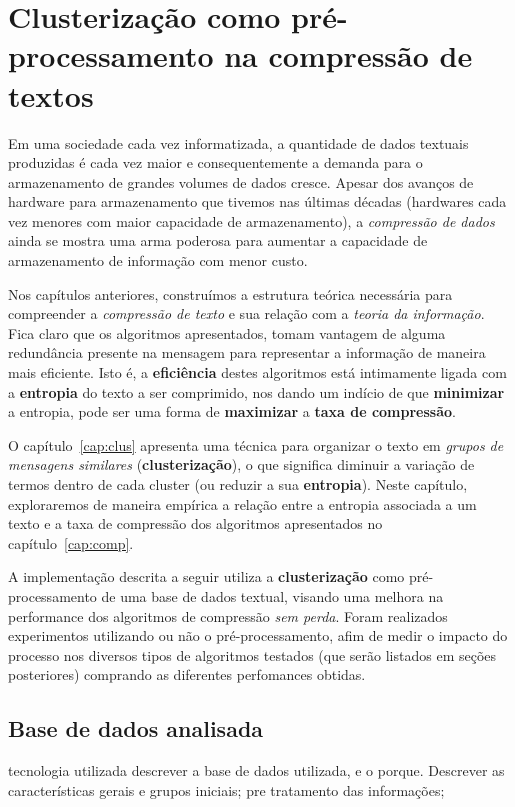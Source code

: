 \chapter{Clusterização como pré-processamento na compressão de textos}
Em uma sociedade cada vez informatizada, a quantidade de dados textuais produzidas é cada vez maior e consequentemente a demanda para o armazenamento de grandes volumes de dados cresce.
Apesar dos avanços de hardware para armazenamento que tivemos nas últimas décadas (hardwares cada vez menores com maior capacidade de armazenamento),
a \emph{compressão de dados} ainda se mostra uma arma poderosa para aumentar a capacidade de armazenamento de informação com menor custo.

Nos capítulos anteriores, construímos a estrutura teórica necessária para compreender a \emph{compressão de texto} e sua relação com a \emph{teoria da informação}.
Fica claro que os algoritmos apresentados, tomam vantagem de alguma redundância presente na mensagem para representar a informação de maneira mais eficiente.
Isto é, a \textbf{eficiência} destes algoritmos está intimamente ligada com a \textbf{entropia} do texto a ser comprimido,
 nos dando um indício de que \textbf{minimizar} a entropia, pode ser uma forma de \textbf{maximizar} a \textbf{taxa de compressão}.
 
O capítulo~\ref{cap:clus} apresenta uma técnica para organizar o texto em \emph{grupos de mensagens similares} (\textbf{clusterização}), o que significa diminuir a variação de termos dentro de cada cluster (ou reduzir a sua \textbf{entropia}).
Neste capítulo, exploraremos de maneira empírica a relação entre a entropia associada a um texto e a taxa de compressão dos algoritmos apresentados no capítulo~\ref{cap:comp}.

A implementação descrita a seguir utiliza a \textbf{clusterização} como pré-processamento de uma base de dados textual, visando uma melhora na performance dos algoritmos de compressão \emph{sem perda}.
Foram realizados experimentos utilizando ou não o pré-processamento, afim de medir o impacto do processo nos diversos tipos de algoritmos testados (que serão listados em seções posteriores) comprando as diferentes perfomances obtidas.

\pagebreak

\section{Base de dados analisada}
tecnologia utilizada
descrever a base de dados utilizada, e o porque.
Descrever as características gerais e grupos iniciais;
pre tratamento das informações;

